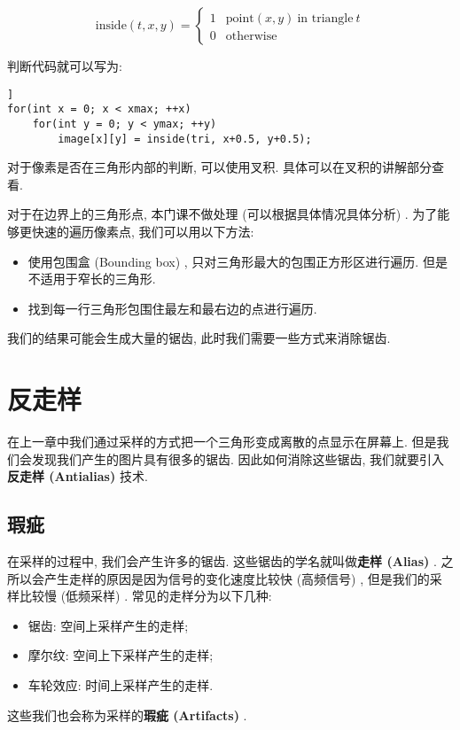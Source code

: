\documentclass[openany]{progbookcn}
\begin{document}
\begin{equation}
	\text{inside}(t, x, y)=\left\{\begin{matrix}
		1 & \text{point}(x,y)\ \text{in triangle}\ t\\ 
		0 & \text{otherwise}
	\end{matrix}\right.
\end{equation}

判断代码就可以写为: 
\begin{lstlisting}]
for(int x = 0; x < xmax; ++x)
	for(int y = 0; y < ymax; ++y)
		image[x][y] = inside(tri, x+0.5, y+0.5);
\end{lstlisting}

对于像素是否在三角形内部的判断, 可以使用叉积. 具体可以在叉积的讲解部分查看. 

对于在边界上的三角形点, 本门课不做处理 (可以根据具体情况具体分析) . 为了能够更快速的遍历像素点, 我们可以用以下方法: 

\begin{itemize}
	\item 使用包围盒 (Bounding box) , 只对三角形最大的包围正方形区进行遍历. 但是不适用于窄长的三角形. 
	\item 找到每一行三角形包围住最左和最右边的点进行遍历. 
\end{itemize}

我们的结果可能会生成大量的锯齿, 此时我们需要一些方式来消除锯齿. 

\chapter{反走样}
在上一章中我们通过采样的方式把一个三角形变成离散的点显示在屏幕上. 但是我们会发现我们产生的图片具有很多的锯齿. 因此如何消除这些锯齿, 我们就要引入\textbf{反走样 (Antialias) }技术. 

\section{瑕疵}
在采样的过程中, 我们会产生许多的锯齿. 这些锯齿的学名就叫做\textbf{走样 (Alias) }. 之所以会产生走样的原因是因为信号的变化速度比较快 (高频信号) , 但是我们的采样比较慢 (低频采样) . 常见的走样分为以下几种: 
\begin{itemize}
	\item 锯齿: 空间上采样产生的走样; 
	\item 摩尔纹: 空间上下采样产生的走样; 
	\item 车轮效应: 时间上采样产生的走样. 
\end{itemize}
这些我们也会称为采样的\textbf{瑕疵 (Artifacts) }. 
\end{document}
